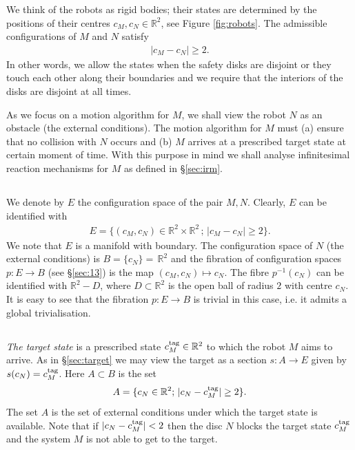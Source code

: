 \documentclass[11pt]{amsart}
\def\R{\mathbb R}
\begin{document}
{We think of the robots as rigid bodies; their states are determined by the positions of their centres $c_M, c_N\in \R^2$,
 see Figure \ref{fig:robots}. 
The admissible configurations of $M$ and $N$ satisfy
\begin{eqnarray}\label{eq:32a}
|c_M-c_N|\ge 2.
\end{eqnarray}
In other words, we allow the states when the safety disks are disjoint or they
touch each other along their boundaries and we require that the interiors of the disks are disjoint at all times. 

As we focus on a motion algorithm for $M$, we shall view the robot $N$ as an obstacle (the external conditions). The motion algorithm for $M$ must (a) ensure that no collision with $N$ occurs and (b) $M$ arrives at a prescribed target state at certain moment of time. With this purpose in mind we shall analyse infinitesimal reaction mechanisms for $M$ as defined in \S \ref{sec:irm}. 

\subsection{} We denote by $E$ the configuration space of the pair $M, N$. Clearly, $E$ can be identified with 
\begin{eqnarray}\label{eq:e}
E= \{(c_M, c_N)\in \R^2\times\R^2\, ;\,  |c_M-c_N|\ge 2\}.
\end{eqnarray}
We note that $E$ is a manifold with boundary. The configuration space of $N$ (the external conditions) is 
$
B=\{c_N\} = \, \R^2
$
and the fibration of configuration spaces 
$
p:E\to B
$  
 (see \S \ref{sec:13}) is the map 
$(c_M, c_N)\mapsto c_N.$
The fibre $p^{-1}(c_N)$ can be identified with $\R^2-D$, where $D\subset \R^2$ is the open ball of radius $2$ with centre 
$c_N$. It is easy to see that the fibration $p:E\to B$ is trivial in this case, i.e. it admits a global trivialisation. 


\subsection{}\label{sec:53t} {\it The target state} is a prescribed state $c_M^{\rm tag}\in \R^2$ to which the robot $M$ aims to arrive. 
As in \S \ref{sec:target} we may view the target as a section 
$s: A\to E$ given by 
$s(c_N)=c_M^{\rm tag}$. Here $A\subset B$ is the set 
$$A=\{c_N\in \R^2; \, |c_N-c_M^{\rm tag}|\ge 2\}.$$ 
The set $A$ is the set of external conditions under which the target state is available. Note that if $|c_N-c_M^{\rm tag}|< 2$ then the disc $N$ blocks the target state $c_M^{\rm tag}$ 
and the system $M$ is not able to get to the target. 

}
\end{document}
